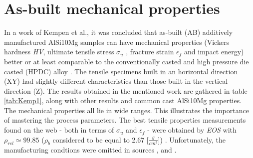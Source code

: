 \section{As-built mechanical properties}
\label{MMABMP}
In a work of Kempen et al., it was concluded that as-built (AB) additively manufactured AlSi10Mg samples can have mechanical properties (Vickers hardness \textit{HV}, ultimate tensile stress $\sigma_u$ , fracture strain $\epsilon_f$ and impact energy) better or at least comparable to the conventionally casted and high pressure die casted (HPDC) alloy \parencite{KEMPEN2012439}. The tensile specimens built in an horizontal direction (XY) had slightly different characteristics than those built in the vertical direction (Z). The results obtained in the mentioned work are gathered in table \ref{tab:Kemp1}, along with other results and common cast AlSi10Mg properties. The mechanical properties all lie in wide ranges. This illustrates the importance of mastering the process parameters. The best tensile properties measurements found on the web - both in terms of $\sigma_u$ and $\epsilon_f$ - were obtained by \textit{EOS} with $\rho_{rel} \simeq 99.85$  ($\rho_b$ considered to be equal to 2.67 [$\frac{g}{cm^3}$]) \parencite{EOS}. Unfortunately, the manufacturing condtions were omitted in sources \parencite{EOS}, \parencite{KEMPEN2012439} and \parencite{LI2016116}.

